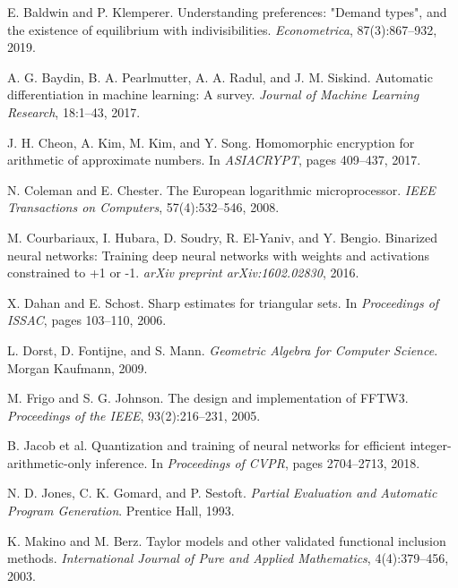 \documentclass[11pt]{article}
\theoremstyle{definition}
\begin{document}
\begin{thebibliography}{99}
E. Baldwin and P. Klemperer.
\newblock Understanding preferences: "Demand types", and the existence of equilibrium with indivisibilities.
\newblock \emph{Econometrica}, 87(3):867--932, 2019.

A. G. Baydin, B. A. Pearlmutter, A. A. Radul, and J. M. Siskind.
\newblock Automatic differentiation in machine learning: A survey.
\newblock \emph{Journal of Machine Learning Research}, 18:1--43, 2017.

J. H. Cheon, A. Kim, M. Kim, and Y. Song.
\newblock Homomorphic encryption for arithmetic of approximate numbers.
\newblock In \emph{ASIACRYPT}, pages 409--437, 2017.

N. Coleman and E. Chester.
\newblock The {European} logarithmic microprocessor.
\newblock \emph{IEEE Transactions on Computers}, 57(4):532--546, 2008.

M. Courbariaux, I. Hubara, D. Soudry, R. El-Yaniv, and Y. Bengio.
\newblock Binarized neural networks: Training deep neural networks with weights and activations constrained to +1 or -1.
\newblock \emph{arXiv preprint arXiv:1602.02830}, 2016.

X. Dahan and E. Schost.
\newblock Sharp estimates for triangular sets.
\newblock In \emph{Proceedings of ISSAC}, pages 103--110, 2006.

L. Dorst, D. Fontijne, and S. Mann.
\newblock \emph{Geometric Algebra for Computer Science}.
\newblock Morgan Kaufmann, 2009.

M. Frigo and S. G. Johnson.
\newblock The design and implementation of {FFTW3}.
\newblock \emph{Proceedings of the IEEE}, 93(2):216--231, 2005.

B. Jacob et al.
\newblock Quantization and training of neural networks for efficient integer-arithmetic-only inference.
\newblock In \emph{Proceedings of CVPR}, pages 2704--2713, 2018.

N. D. Jones, C. K. Gomard, and P. Sestoft.
\newblock \emph{Partial Evaluation and Automatic Program Generation}.
\newblock Prentice Hall, 1993.

K. Makino and M. Berz.
\newblock Taylor models and other validated functional inclusion methods.
\newblock \emph{International Journal of Pure and Applied Mathematics}, 4(4):379--456, 2003.


\end{thebibliography}
\end{document}
